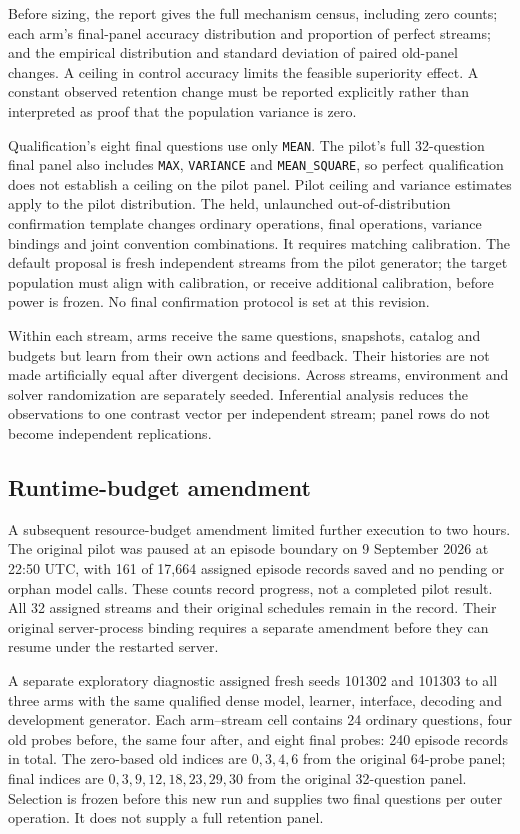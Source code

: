 \documentclass[10pt,twocolumn]{article}
\newcommand{\code}[1]{\texttt{\small #1}}
\begin{document}
Before sizing, the report gives the full mechanism census, including zero
counts; each arm's final-panel accuracy distribution and proportion of perfect
streams; and the empirical distribution and standard deviation of paired
old-panel changes. A ceiling in control accuracy limits the feasible superiority
effect. A constant observed retention change must be reported explicitly rather
than interpreted as proof that the population variance is zero.

Qualification's eight final questions use only \code{MEAN}. The pilot's full
32-question final panel also includes \code{MAX}, \code{VARIANCE} and
\code{MEAN\_SQUARE}, so perfect qualification does not establish a ceiling on
the pilot panel. Pilot ceiling and variance estimates apply to the pilot
distribution. The held, unlaunched out-of-distribution confirmation template
changes ordinary operations, final operations, variance bindings and joint
convention combinations. It requires matching calibration. The default proposal
is fresh independent streams from the pilot generator; the target population
must align with calibration, or receive additional calibration, before power
is frozen. No final confirmation protocol is set at this revision.

Within each stream, arms receive the same questions, snapshots, catalog and
budgets but learn from their own actions and feedback. Their histories are not
made artificially equal after divergent decisions. Across streams, environment
and solver randomization are separately seeded. Inferential analysis reduces
the observations to one contrast vector per independent stream; panel rows do
not become independent replications.

\subsection{Runtime-budget amendment}
A subsequent resource-budget amendment limited further execution to two hours.
The original pilot was paused at an episode boundary on 9 September 2026 at
22:50 UTC, with 161 of 17,664 assigned episode records saved and no pending or
orphan model calls. These counts record progress, not a completed pilot result.
All 32 assigned streams and their original schedules remain in the record.
Their original server-process binding requires a separate amendment before
they can resume under the restarted server.

A separate exploratory diagnostic assigned fresh seeds 101302 and 101303 to all
three arms with the same qualified dense model, learner, interface, decoding and
development generator. Each arm--stream cell contains 24 ordinary questions,
four old probes before, the same four after, and eight final probes: 240 episode
records in total. The zero-based old indices are $0,3,4,6$ from the original
64-probe panel; final indices are $0,3,9,12,18,23,29,30$ from the original
32-question panel. Selection is frozen before this new run and supplies two
final questions per outer operation. It does not supply a full retention panel.
\end{document}
